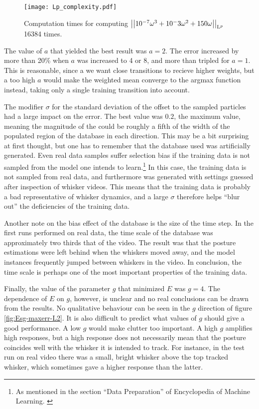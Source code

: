\begin{figure}
  \centering
  \texttt{[image: Lp\_complexity.pdf]}
  \caption{Computation times for computing $\left\vert\left\vert10^{-7}\omega^3 +
      10^-3\omega^2 + 150\omega\right\vert\right\vert_{\mathrm{L}^{p}}$ 16384 times.}
  \label{fig:Lp-complexity}
\end{figure}

The value of $a$ that yielded the best result was $a=2$. The error
increased by more than 20\% when $a$ was increased to 4 or 8, and more
than tripled for $a=1$. This is reasonable, since a we want close
transitions to recieve higher weights, but a too high $a$ would make
the weighted mean converge to the argmax function instead, taking only
a single training transition into account.

The modifier $\sigma$ for the standard deviation of the offset to the
sampled particles had a large impact on the error. The best value was
$0.2$, the maximum value, meaning the magnitude of the could be
roughly a fifth of the width of the populated region of the database
in each direction. This may be a bit surprising at first thought, but
one has to remember that the database used was artificially
generated. Even real data samples suffer selection bias if the
training data is not sampled from the model one intends to
learn.\footnote{As mentioned in the section ``Data Preparation'' of
  Encyclopedia of Machine Learning. \cite{EncyclopediaMachineLearning}}
In this case, the training data is not sampled from real data, and
furthermore was generated with settings guessed after inspection of
whisker videos. This means that the training data is probably a bad
representative of whisker dynamics, and a large $\sigma$ therefore
helps ``blur out'' the deficiencies of the training data.

Another note on the bias effect of the database is the size of the
time step. In the first runs performed on real data, the time scale of
the database was approximately two thirds that of the video. The
result was that the posture estimations were left behind when the
whiskers moved away, and the model instances frequently jumped between
whiskers in the video. In conclusion, the time scale is perhaps one of
the most important properties of the training data.

Finally, the value of the parameter $g$ that minimized $E$ was
$g=4$. The dependence of $E$ on $g$, however, is unclear and no real
conclusions can be drawn from the results. No qualitative behaviour
can be seen in the $g$ direction of figure \ref{fig:Esg-maxerr-L2}. It
is also difficult to predict what values of $g$ should give a good
performance. A low $g$ would make clutter too important. A high $g$
amplifies high responses, but a high response does not necessarily
mean that the posture coincides well with the whisker it is intended
to track. For instance, in the test run on real video there was a
small, bright whisker above the top tracked whisker, which sometimes
gave a higher response than the latter.




